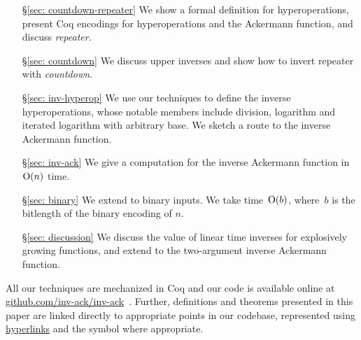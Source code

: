 \begin{itemize}
    \item[\S\ref{sec: countdown-repeater}] We show a formal definition for hyperoperations, present Coq encodings for hyperoperations and the Ackermann function, and discuss \emph{repeater}.
    \item[\S\ref{sec: countdown}] We discuss upper inverses and show how to invert repeater with \emph{countdown}.
    \item[\S\ref{sec: inv-hyperop}] We use our techniques to define the inverse hyperoperations, whose notable members include division, logarithm and iterated logarithm with arbitrary base. We sketch a route to the inverse Ackermann function.
    \item[\S\ref{sec: inv-ack}] We give a computation for the inverse Ackermann function in $\text{O}(n)$ time.
    \item[\S\ref{sec: binary}] We extend to binary inputs. We take time~$\text{O}(b)$, 
    where~$b$ is the bitlength of the binary encoding of $n$.
    \item[\S\ref{sec: discussion}] We discuss the value of linear time inverses for
explosively growing functions, and extend to the two-argument inverse Ackermann function. %
\end{itemize}
All our techniques are mechanized in Coq and our code is available
online at \href{https://github.com/inv-ack/inv-ack}{\color{blue}github.com/inv-ack/inv-ack}~\cite{inv-ack}. Further, definitions and theorems presented
in this paper are linked directly to appropriate points in our codebase,
represented using \href{https://github.com/inv-ack/inv-ack}{\color{blue}hyperlinks}
and the symbol \href{https://github.com/inv-ack/inv-ack}{\color{blue}\coq} where appropriate.


